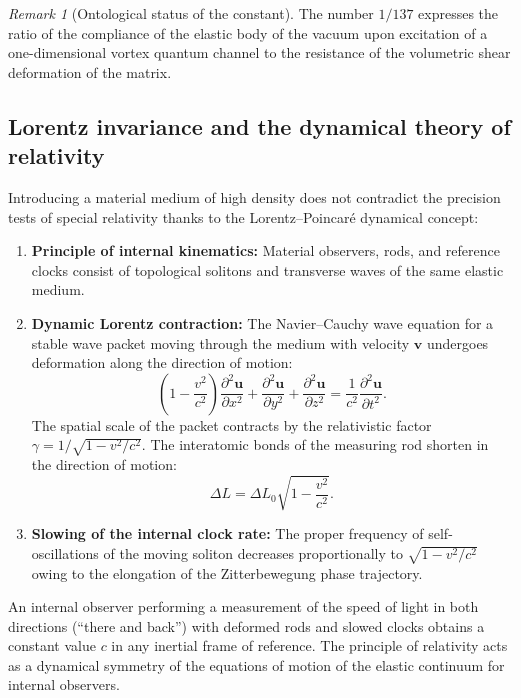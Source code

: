 \documentclass[11pt,a4paper]{article}
\theoremstyle{definition}
\theoremstyle{remark}
\newtheorem{remark}{Remark}
\begin{document}
\begin{remark}[Ontological status of the constant]
The number $1/137$ expresses the ratio of the compliance of the elastic body of the vacuum upon excitation of a one-dimensional vortex quantum channel to the resistance of the volumetric shear deformation of the matrix.
\end{remark}
	
\subsection{Lorentz invariance and the dynamical theory of relativity}
	
Introducing a material medium of high density does not contradict the precision tests of special relativity thanks to the Lorentz--Poincaré dynamical concept:
	
\begin{enumerate}
	\item \textbf{Principle of internal kinematics:} Material observers, rods, and reference clocks consist of topological solitons and transverse waves of the same elastic medium.
	\item \textbf{Dynamic Lorentz contraction:} The Navier--Cauchy wave equation for a stable wave packet moving through the medium with velocity $\mathbf{v}$ undergoes deformation along the direction of motion:
\begin{equation}
	\left(1 - \frac{v^2}{c^2}\right) \frac{\partial^2 \mathbf{u}}{\partial x^2} + \frac{\partial^2 \mathbf{u}}{\partial y^2} + \frac{\partial^2 \mathbf{u}}{\partial z^2} = \frac{1}{c^2} \frac{\partial^2 \mathbf{u}}{\partial t^2}.
	\label{eq:navier_cauchy_moving}
\end{equation}
The spatial scale of the packet contracts by the relativistic factor $\gamma = 1/\sqrt{1 - v^2/c^2}$. The interatomic bonds of the measuring rod shorten in the direction of motion:
\begin{equation}
	\Delta L = \Delta L_0 \sqrt{1 - \frac{v^2}{c^2}}.
	\label{eq:lorentz_length_contraction}
\end{equation}
\item \textbf{Slowing of the internal clock rate:} The proper frequency of self-oscillations of the moving soliton decreases proportionally to $\sqrt{1 - v^2/c^2}$ owing to the elongation of the Zitterbewegung phase trajectory.
\end{enumerate}
	
	An internal observer performing a measurement of the speed of light in both directions (``there and back'') with deformed rods and slowed clocks obtains a constant value $c$ in any inertial frame of reference. The principle of relativity acts as a dynamical symmetry of the equations of motion of the elastic continuum for internal observers.
	
\end{document}
